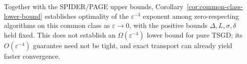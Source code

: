 Together with the SPIDER/PAGE upper bounds,
Corollary~\ref{cor:common-class-lower-bound} establishes optimality
of the $\varepsilon^{-3}$ exponent among zero-respecting algorithms
on this common class as $\varepsilon\to0$, with the positive bounds
$\Delta,L,\sigma,\delta$ held fixed. This does not establish an
$\Omega(\varepsilon^{-4})$ lower bound for pure TSGD; its
$O(\varepsilon^{-4})$ guarantee need not be tight, and exact transport
can already yield faster convergence.
